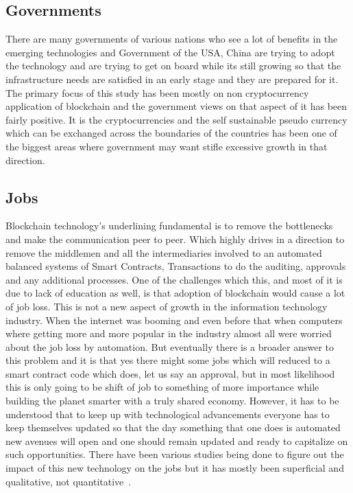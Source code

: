 \subsection{Governments}

There are many governments of various nations who see a lot of
benefits in the emerging technologies and Government of the USA, China
are trying to adopt the technology and are trying to get on board
while its still growing so that the infrastructure needs are satisfied
in an early stage and they are prepared for it. The primary focus of
this study has been mostly on non cryptocurrency application of
blockchain and the government views on that aspect of it has been
fairly positive. It is the cryptocurrencies and the self sustainable
pseudo currency which can be exchanged across the boundaries of the
countries has been one of the biggest areas where government may want
stifle excessive growth in that direction.

\subsection{Jobs}

Blockchain technology's underlining fundamental is to remove the
bottlenecks and make the communication peer to peer. Which highly
drives in a direction to remove the middlemen and all the
intermediaries involved to an automated balanced systems of Smart
Contracts, Transactions to do the auditing, approvals and any additional
processes. One of the challenges which this, and most of
it is due to lack of education as
well, is that adoption of blockchain would cause a lot of job loss.
This is not a new aspect of growth in the information technology
industry. When the internet was booming and even before that when
computers where getting more and more popular in the industry almost
all were worried about the job loss by automation. But eventually
there is a broader answer to this problem and it is that yes there
might some jobs which will reduced to a smart contract code which
does, let us say an approval, but in most likelihood this is only going
to be shift of job to something of more importance while building the
planet smarter with a truly shared economy. However, it has to be
understood that to keep up with technological advancements everyone
has to keep themselves updated so that the day something that one does
is automated new avenues will open and one should remain updated and
ready to capitalize on such opportunities. There have been various
studies being done to figure out the impact of this new technology on
the jobs but it has mostly been superficial and qualitative, not
quantitative~\cite{michael34}.


